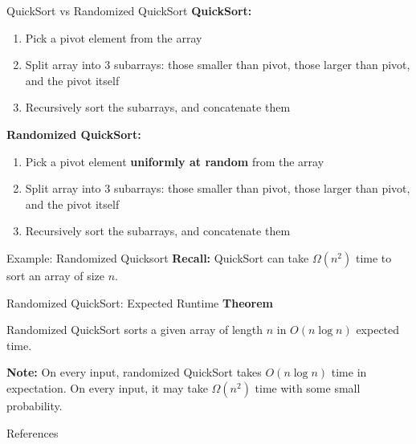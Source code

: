 \documentclass[aspectratio=169]{beamer}
\begin{document}
\begin{frame}{QuickSort vs Randomized QuickSort}
  \textbf{QuickSort:}
  \begin{enumerate}
    \item Pick a pivot element from the array
    \item Split array into 3 subarrays: those smaller than pivot, those larger than pivot, and the pivot itself
    \item Recursively sort the subarrays, and concatenate them
  \end{enumerate}
  \vspace{1em}
  \textbf{Randomized QuickSort:}
  \begin{enumerate}
    \item Pick a pivot element \textbf{uniformly at random} from the array
    \item Split array into 3 subarrays: those smaller than pivot, those larger than pivot, and the pivot itself
    \item Recursively sort the subarrays, and concatenate them
  \end{enumerate}
\end{frame}

\begin{frame}{Example: Randomized Quicksort}
  \textbf{Recall:} QuickSort can take $\Omega(n^2)$ time to sort an array of size $n$.
\end{frame}

\begin{frame}{Randomized QuickSort: Expected Runtime}
  \textbf{Theorem}
  \begin{block}{}
    Randomized QuickSort sorts a given array of length $n$ in $O(n \log n)$ expected time.
  \end{block}
  \vspace{1em}
  \textbf{Note:} On every input, randomized QuickSort takes $O(n \log n)$ time in expectation. On every input, it may take $\Omega(n^2)$ time with some small probability.
\end{frame}











\begin{frame}[allowframebreaks]{References}
  \printbibliography
\end{frame}
\end{document}
